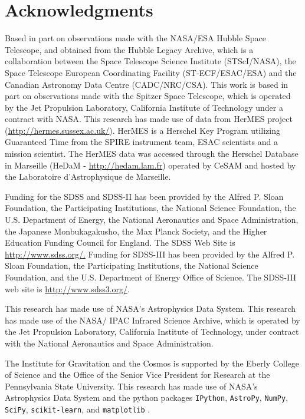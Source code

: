 \documentclass[preprint,natbib209]{aastex}
\begin{document}
\acknowledgments
\section*{Acknowledgments}
Based in part on observations made with the NASA/ESA Hubble Space Telescope, 
and obtained from the Hubble Legacy Archive, which is a collaboration between
the Space Telescope Science Institute (STScI/NASA), the Space Telescope 
European Coordinating Facility (ST-ECF/ESAC/ESA) and the 
Canadian Astronomy Data Centre (CADC/NRC/CSA). 
This work is based in part on observations made with the Spitzer Space Telescope, 
which is operated by the Jet Propulsion Laboratory, California Institute of Technology under a contract with NASA.
This research has made use of data from HerMES project (\url{http://hermes.sussex.ac.uk/}). 
HerMES is a Herschel Key Program utilizing Guaranteed Time from the SPIRE instrument team,
ESAC scientists and a mission scientist.
The HerMES data was accessed through the Herschel Database in 
Marseille (HeDaM - \url{http://hedam.lam.fr}) operated by CeSAM and
hosted by the Laboratoire d'Astrophysique de Marseille.

Funding for the SDSS and SDSS-II has been provided by the Alfred P. Sloan Foundation, 
the Participating Institutions, the National Science Foundation, the U.S. Department of Energy, 
the National Aeronautics and Space Administration, the Japanese Monbukagakusho, 
the Max Planck Society, and the Higher Education Funding Council for England. 
The SDSS Web Site is \url{http://www.sdss.org/.}
Funding for SDSS-III has been provided by the Alfred P. Sloan Foundation, the Participating Institutions, 
the National Science Foundation, and the U.S. Department of Energy Office of Science. 
The SDSS-III web site is \url{http://www.sdss3.org/}.

This research has made use of NASA's Astrophysics Data System.
This research has made use of the NASA/ IPAC Infrared Science Archive, 
which is operated by the Jet Propulsion Laboratory, California Institute of Technology, 
under contract with the National Aeronautics and Space Administration.

The Institute for Gravitation and the Cosmos is 
supported by the Eberly College of Science and the Office of the Senior Vice
President for Research at the Pennsylvania 
State University. This research has made use of NASA's Astrophysics Data System 
and the python packages \texttt{IPython}, \texttt{AstroPy}, 
\texttt{NumPy}, \texttt{SciPy}, \texttt{scikit-learn}, and \texttt{matplotlib}
 \citep{ipython, astropy, numpy, scipy, scikit-learn, matplotlib}.



\end{document}
